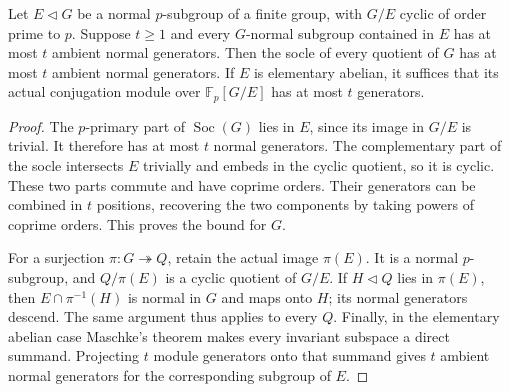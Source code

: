 \begin{lemma}
\label{lem:coprime-cyclic-quotient-socles}
Let $E\lhd G$ be a normal $p$-subgroup of a finite group, with
$G/E$ cyclic of order prime to $p$. Suppose $t\geq1$ and every
$G$-normal subgroup contained in $E$ has at most $t$ ambient normal
generators. Then the socle of every quotient of $G$ has at most $t$
ambient normal generators.
If $E$ is elementary abelian, it suffices that its actual conjugation
module over $\mathbb F_p[G/E]$ has at most $t$ generators.
\end{lemma}
\begin{proof}
The $p$-primary part of $\operatorname{Soc}(G)$ lies in $E$, since
its image in $G/E$ is trivial. It therefore has at most $t$ normal
generators. The complementary part of the socle intersects $E$
trivially and embeds in the cyclic quotient, so it is cyclic. These
two parts commute and have coprime orders. Their generators can be
combined in $t$ positions, recovering the two components by taking
powers of coprime orders. This proves the bound for $G$.

For a surjection $\pi:G\twoheadrightarrow Q$, retain the actual image
$\pi(E)$. It is a normal $p$-subgroup, and $Q/\pi(E)$ is a cyclic
quotient of $G/E$. If $H\lhd Q$ lies in $\pi(E)$, then
$E\cap\pi^{-1}(H)$ is normal in $G$ and maps onto $H$; its normal
generators descend. The same argument thus applies to every $Q$.
Finally, in the elementary abelian case Maschke's theorem makes every
invariant subspace a direct summand. Projecting $t$ module generators
onto that summand gives $t$ ambient normal generators for the
corresponding subgroup of $E$.
\end{proof}

